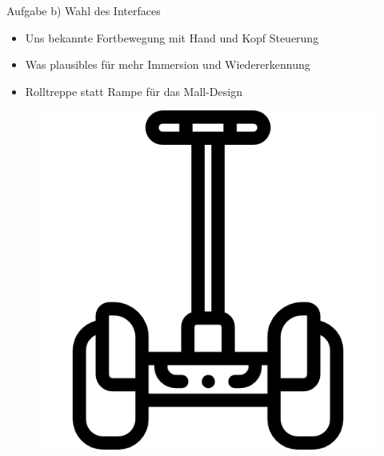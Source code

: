 \documentclass{beamer}
\begin{document}
\begin{frame}{Aufgabe b) Wahl des Interfaces}
\begin{minipage}[c]{0.72\textwidth}
\begin{itemize}
\item Uns bekannte Fortbewegung mit Hand und Kopf Steuerung
\item Was plausibles für mehr Immersion und Wiedererkennung
\item Rolltreppe statt Rampe für das Mall-Design
\end{itemize}
\end{minipage}
\hfill
\begin{minipage}[c]{0.25\textwidth}
\begin{figure}
\centering
\includegraphics[width=\textwidth, keepaspectratio]{img/segway}
\caption{\cite{segway}}
\end{figure}
\end{minipage}
\end{frame}
\end{document}
